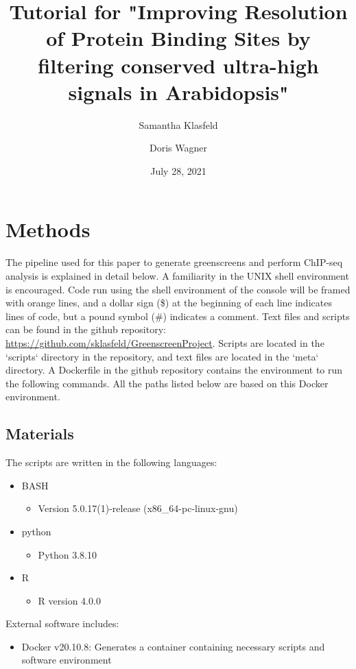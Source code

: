 \documentclass{article}
\title{Tutorial for "Improving Resolution of Protein Binding Sites by filtering conserved ultra-high signals in Arabidopsis"}
\author[1]{Samantha Klasfeld}
\author[1]{Doris Wagner}
\affil[1]{Department of Biology, University of Pennsylvania}
\date{July 28, 2021}
\begin{document}
\begin{sloppypar}
\maketitle

\tableofcontents
\newpage

\section{Methods}
The pipeline used for this paper to generate greenscreens and perform ChIP-seq analysis is explained in detail below. A familiarity in the UNIX shell environment is encouraged.  Code run using the shell environment of the console will be framed with orange lines,  and a dollar sign (\$) at the beginning of each line indicates lines of code, but a pound symbol (\#) indicates a comment. Text files and scripts can be found in the github repository: \url{https://github.com/sklasfeld/GreenscreenProject}. Scripts are located in the `scripts` directory in the repository, and text files are located in the `meta` directory. A Dockerfile in the github repository contains the environment to run the following commands. All the paths listed below are based on this Docker environment.

\subsection{Materials}
The scripts are written in the following languages:
\begin{itemize}
    \item BASH
    \begin{itemize}
        \item Version 5.0.17(1)-release (x86\_64-pc-linux-gnu)
    \end{itemize}
    \item python
    \begin{itemize}
        \item Python 3.8.10
    \end{itemize}
    \item R
    \begin{itemize}
        \item R version 4.0.0
    \end{itemize}
\end{itemize}

External software includes:
\begin{itemize}
    \item Docker v20.10.8: Generates a container containing necessary scripts and software environment \cite{Docker}
\end{itemize}


\end{sloppypar}
\end{document}
